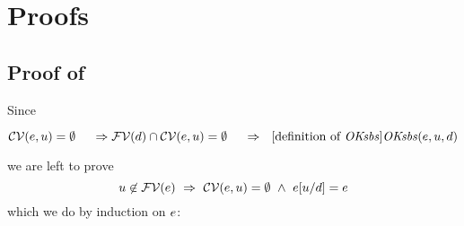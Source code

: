 \section{Proofs}
\label{proofs}



\subsection*{Proof of }

Since
\begin{links}
$\mathcal{CV}(e,u)=\emptyset
 \\\hspace*{1em}\ \Rightarrow\ \\
 \mathcal{FV}(d)\cap\mathcal{CV}(e,u)=\emptyset
 \\\hspace*{1em}\ \Rightarrow\ \ [\mbox{definition of $\mathit{OKsbs}$}]\\
 \mathit{OKsbs}(e,u,d)$
\end{links}
we are left to prove
\[
u\not\in\mathcal{FV}(e)\ \Rightarrow\ 
\mathcal{CV}(e,u)=\emptyset\ \wedge\ 
e[u/d]=e
\]
which we do by induction on $e$:
